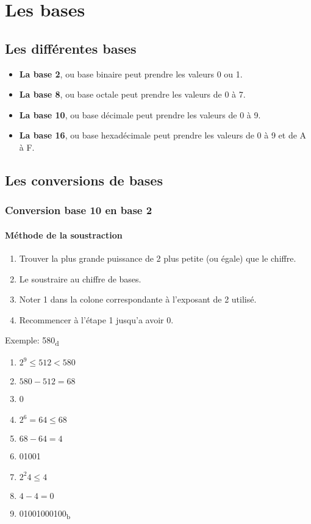 \documentclass[10pt,a4paper]{article}
\begin{document}
 \section{Les bases}
 \subsection{Les différentes bases}
 \begin{itemize}
	 \item \textbf{La base 2}, ou base binaire peut prendre les valeurs 0 ou 1.
	 \item \textbf{La base 8}, ou base octale peut prendre les valeurs de 0 à 7.
	 \item \textbf{La base 10}, ou base décimale peut prendre les valeurs de 0 à 9.
	 \item \textbf{La base 16}, ou base hexadécimale peut prendre les valeurs de 0 à 9 et de A à F.
 \end{itemize}

 \subsection{Les conversions de bases}
 \subsubsection{Conversion base 10 en base 2}
 \paragraph{Méthode de la soustraction}
 \begin{enumerate}
	 \item Trouver la plus grande puissance de 2 plus petite (ou égale) que le chiffre.
	 \item Le soustraire au chiffre de bases.
	 \item Noter 1 dans la colone correspondante à l'exposant de 2 utilisé.
	 \item Recommencer à l'étape 1 jusqu'a avoir 0.
 \end{enumerate}
 Exemple: 580\textsubscript{d}
 \begin{enumerate}
	 \item $2^9 \leq 512 < 580$
	 \item $580 - 512 = 68$
	 \item 0
	 \item $2^6 = 64 \leq 68$
	 \item $68 - 64 = 4$
	 \item 01001
	 \item $2^2 4 \leq 4$
	 \item $4 - 4 = 0$
	 \item 01001000100\textsubscript{b}
 \end{enumerate}
\end{document}
